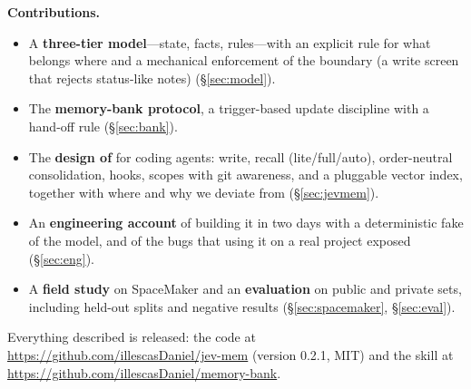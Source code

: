 \noindent\textbf{Contributions.}
\begin{itemize}
\item A \textbf{three-tier model}---state, facts, rules---with an explicit rule for what belongs where and a mechanical enforcement of the boundary (a write screen that rejects status-like notes) (\S\ref{sec:model}).
\item The \textbf{memory-bank protocol}, a trigger-based update discipline with a hand-off rule (\S\ref{sec:bank}).
\item The \textbf{design of \jevmem} for coding agents: write, recall (lite/full/auto), order-neutral consolidation, hooks, scopes with git awareness, and a pluggable vector index, together with where and why we deviate from \jevmempaper{} (\S\ref{sec:jevmem}).
\item An \textbf{engineering account} of building it in two days with a deterministic fake of the model, and of the bugs that using it on a real project exposed (\S\ref{sec:eng}).
\item A \textbf{field study} on SpaceMaker and an \textbf{evaluation} on public and private sets, including held-out splits and negative results (\S\ref{sec:spacemaker}, \S\ref{sec:eval}).
\end{itemize}
Everything described is released: the code at \url{https://github.com/illescasDaniel/jev-mem} (version 0.2.1, MIT) and the skill at \url{https://github.com/illescasDaniel/memory-bank}.
